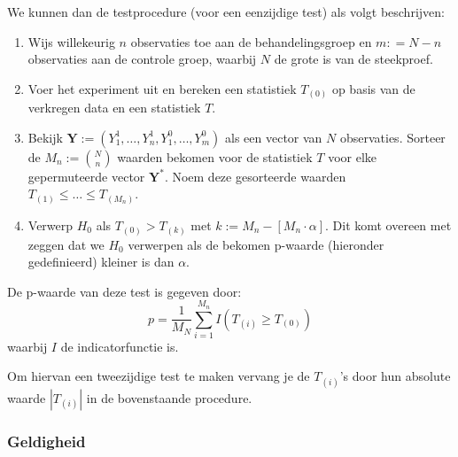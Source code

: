 \documentclass[12pt, a4paper, faculty=we]{ugent-doc}
\begin{document}
\begin{flushleft}
    We kunnen dan de testprocedure (voor een eenzijdige test) als volgt beschrijven:
    \begin{enumerate}
        \item Wijs willekeurig \(n\) observaties toe aan de behandelingsgroep en \(m : = N-n\) observaties aan de controle groep, waarbij $N$ de grote is van de steekproef.
        \item Voer het experiment uit en bereken een statistiek \(T_{(0)}\) op basis van de verkregen data en een statistiek \(T\).
        \item Bekijk \(\mathbf{Y} := (Y^1_1, \ldots, Y^1_n, Y^0_1, \ldots, Y^0_m)\) als een vector van \(N\) observaties. Sorteer de \(M_n := \binom{N}{n}\) 
        waarden bekomen voor de statistiek \(T\) voor elke gepermuteerde vector \(\mathbf{Y}^*\). Noem deze gesorteerde waarden 
        \(T_{(1)}  \leq \ldots \leq T_{(M_n)}\).
        \item Verwerp \(H_0\) als \(T_{(0)} > T_{(k)}\) met \(k:= M_n-[M_n\cdot\alpha]\). Dit komt overeen met zeggen dat we \(H_0\) verwerpen als 
        de bekomen p-waarde (hieronder gedefinieerd) kleiner is dan \(\alpha\).
    \end{enumerate}
    De p-waarde van deze test is gegeven door:
    \[
        p = \frac{1}{M_N} \sum_{i=1}^{M_n} I(T_{(i)} \geq T_{(0)})
    \]
    waarbij \(I\) de indicatorfunctie is.
\end{flushleft}

\begin{flushleft}
    Om hiervan een tweezijdige test te maken vervang je de \(T_{(i)}\)'s door hun absolute waarde \(|T_{(i)}|\) in de bovenstaande procedure.
\end{flushleft}

\subsubsection{Geldigheid}
\end{document}
